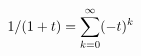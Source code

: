 \documentclass[preview]{standalone}
\begin{document}
\begin{align*}
\special{dvisvgm:raw <g id='unique000'>}1/(1+t)=\sum_{k=0}^{\infty}(-t)^k\special{dvisvgm:raw </g>}
\end{align*}
\end{document}
